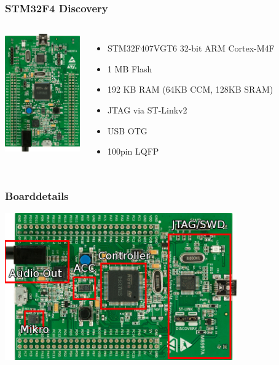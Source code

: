 \documentclass[ngerman,compress]{beamer}
\begin{document}
\begin{frame}
	\frametitle{STM32F4 Discovery}
		\begin{columns}
			\column{1.5in}
				\includegraphics[height=2in]{stm32f4_discovery.jpg}
			\column{1.5in}
				\begin{itemize}
				\item STM32F407VGT6 32-bit ARM Cortex-M4F
				\item 1 MB Flash 
				\item 192 KB RAM (64KB CCM, 128KB SRAM)
				\item JTAG via ST-Linkv2
				\item USB OTG
				\item 100pin LQFP
				\end{itemize}
		\end{columns}
\end{frame}

\begin{frame}
	\frametitle{Boarddetails}
	\includegraphics[height=2.5in]{stm32f4_discovery_beschriftet.png}
\end{frame}
\end{document}
